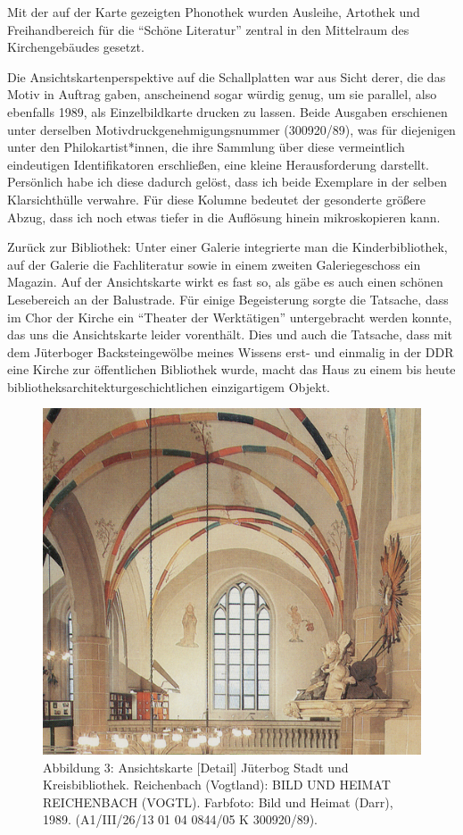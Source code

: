 \documentclass[a4paper,
fontsize=11pt,
oneside,
numbers=noperiodatend,
parskip=half-,
bibliography=totoc,
final
]{scrartcl}
\begin{document}
Mit der auf der Karte gezeigten Phonothek wurden Ausleihe, Artothek und
Freihandbereich für die \enquote{Schöne Literatur} zentral in den
Mittelraum des Kirchengebäudes gesetzt.

Die Ansichtskartenperspektive auf die Schallplatten war aus Sicht derer,
die das Motiv in Auftrag gaben, anscheinend sogar würdig genug, um sie
parallel, also ebenfalls 1989, als Einzelbildkarte drucken zu lassen.
Beide Ausgaben erschienen unter derselben Motivdruckgenehmigungsnummer
(300920/89), was für diejenigen unter den Philokartist*innen, die ihre
Sammlung über diese vermeintlich eindeutigen Identifikatoren
erschließen, eine kleine Herausforderung darstellt. Persönlich habe ich
diese dadurch gelöst, dass ich beide Exemplare in der selben
Klarsichthülle verwahre. Für diese Kolumne bedeutet der gesonderte
größere Abzug, dass ich noch etwas tiefer in die Auflösung hinein
mikroskopieren kann.

Zurück zur Bibliothek: Unter einer Galerie integrierte man die
Kinderbibliothek, auf der Galerie die Fachliteratur sowie in einem
zweiten Galeriegeschoss ein Magazin. Auf der Ansichtskarte wirkt es fast
so, als gäbe es auch einen schönen Lesebereich an der Balustrade. Für
einige Begeisterung sorgte die Tatsache, dass im Chor der Kirche ein
\enquote{Theater der Werktätigen} untergebracht werden konnte, das uns
die Ansichtskarte leider vorenthält. Dies und auch die Tatsache, dass
mit dem Jüterboger Backsteingewölbe meines Wissens erst- und einmalig in
der DDR eine Kirche zur öffentlichen Bibliothek wurde, macht das Haus zu
einem bis heute bibliotheksarchitekturgeschichtlichen einzigartigem
Objekt.

\begin{figure}
\centering
\includegraphics[width=.7\textwidth]{img/Abb3.jpg}
\caption{Abbildung 3: Ansichtskarte {[}Detail{]} Jüterbog Stadt und
Kreisbibliothek. Reichenbach (Vogtland): BILD UND HEIMAT REICHENBACH
(VOGTL). Farbfoto: Bild und Heimat (Darr), 1989. (A1/III/26/13 01 04
0844/05 K 300920/89).}
\end{figure}
\end{document}
